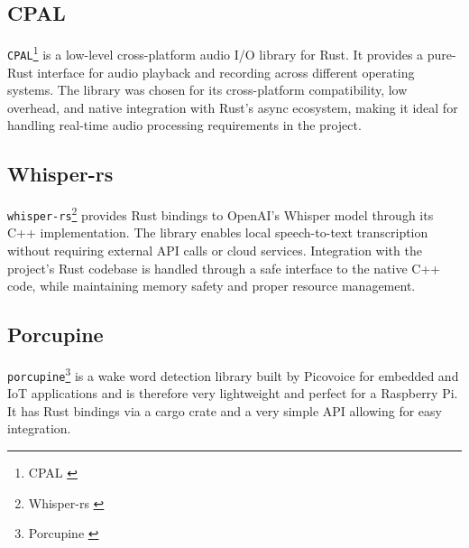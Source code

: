 \subsection{CPAL}
\texttt{CPAL}\footnote{CPAL \cite{cpal}} is a low-level cross-platform audio I/O library for Rust.
It provides a pure-Rust interface for audio playback and recording across different operating systems.
The library was chosen for its cross-platform compatibility, low overhead, and native integration with Rust's async ecosystem,
making it ideal for handling real-time audio processing requirements in the project.

\subsection{Whisper-rs}
\texttt{whisper-rs}\footnote{Whisper-rs \cite{whisper-rs}} provides Rust bindings to OpenAI's Whisper model through its C++ implementation.
The library enables local speech-to-text transcription without requiring external API calls or cloud services.
Integration with the project's Rust codebase is handled through a safe interface to the native C++ code,
while maintaining memory safety and proper resource management.

\subsection{Porcupine}
\texttt{porcupine}\footnote{Porcupine \cite{porcupine}} is a wake word detection library built by Picovoice
for embedded and IoT applications and is therefore very lightweight and perfect for a Raspberry Pi.
It has Rust bindings via a cargo crate and a very simple API allowing for easy integration.
